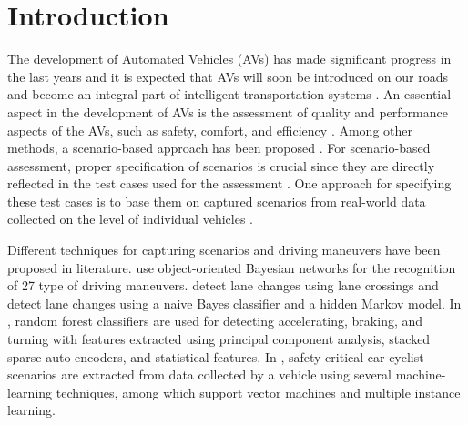 \section{Introduction}
\label{sec:introduction}

\cstartg
The development of Automated Vehicles (AVs) has made significant progress in the last years and it is expected that AVs will soon be introduced on our roads \autocite{madni2018autonomous,bimbraw2015autonomous} and become an integral part of intelligent transportation systems \autocite{eskandarian2012introduction,chanedmiston2020itsjpo}. \cendg
\cstarta An essential aspect in the development of AVs is the assessment of quality and performance aspects of the AVs, such as safety, comfort, and efficiency \autocite{bengler2014threedecades, stellet2015taxonomy}. 
Among other methods, a scenario-based approach has been proposed \autocite{elrofai2018scenario, putz2017pegasus}. 
For scenario-based assessment, proper specification of scenarios is crucial since they are directly reflected in the test cases used for the assessment \autocite{stellet2015taxonomy}. 
One approach for specifying these test cases is to base them on captured scenarios from real-world data collected on the level of individual vehicles \autocite{elrofai2018scenario, putz2017pegasus, roesener2016scenariobased, deGelder2017assessment}. 

Different techniques for capturing scenarios and driving maneuvers have been proposed in literature. 
\textcite{kasper2012oobayesnetworks} use object-oriented Bayesian networks for the recognition of 27 type of driving maneuvers. 
\textcite{krajewski2018highD} detect lane changes using lane crossings and \textcite{schlechtriemen2015lanechange} detect lane changes using a naive Bayes classifier and a hidden Markov model. 
In \autocite{xie2017driving}, random forest classifiers are used for detecting accelerating, braking, and turning with features extracted using principal component analysis, stacked sparse auto-encoders, and statistical features.
In \autocite{cara2015carcyclist}, safety-critical car-cyclist scenarios are extracted from data collected by a vehicle using several machine-learning techniques, among which support vector machines and multiple instance learning.

